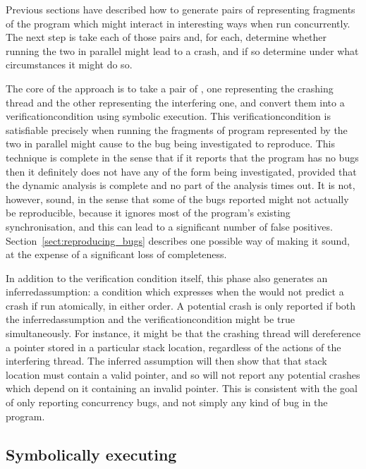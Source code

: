 Previous sections have described how to generate pairs of
{\StateMachines} representing fragments of the program which might
interact in interesting ways when run concurrently.  The next step is
take each of those pairs and, for each, determine whether running the
two {\StateMachines} in parallel might lead to a crash, and if so
determine under what circumstances it might do so.

The core of the approach is to take a pair of {\StateMachines}, one
representing the crashing thread and the other representing the
interfering one, and convert them into a
\gls{verificationcondition}\cite{Floyd1967} using symbolic
execution\cite{King1976}.  This \gls{verificationcondition} is
satisfiable precisely when running the fragments of program
represented by the two {\StateMachines} in parallel might cause to the
bug being investigated to reproduce.  This technique is complete in
the sense that if it reports that the program has no bugs then it
definitely does not have any of the form being investigated, provided
that the dynamic analysis is complete and no part of the analysis
times out.  It is not, however, sound, in the sense that some of the
bugs reported might not actually be reproducible, because it ignores
most of the program's existing synchronisation, and this can lead to a
significant number of false positives.
Section~\ref{sect:reproducing_bugs} describes one possible way of
making it sound, at the expense of a significant loss of completeness.

In addition to the verification condition itself, this phase also
generates an \gls{inferredassumption}: a condition which expresses when the
{\StateMachines} would not predict a crash if run atomically, in
either order.  A potential crash is only reported if both the
\gls{inferredassumption} and the \gls{verificationcondition} might be
true simultaneously.  For instance, it might be that the crashing
thread will dereference a pointer stored in a particular stack
location, regardless of the actions of the interfering thread.  The
inferred assumption will then show that that stack location must
contain a valid pointer, and so {\technique} will not report any
potential crashes which depend on it containing an invalid pointer.
This is consistent with the goal of only reporting concurrency bugs,
and not simply any kind of bug in the program.

\subsection{Symbolically executing {\StateMachines}}
\label{sect:derive:symbolic_execute}

